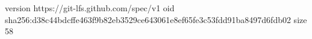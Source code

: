 version https://git-lfs.github.com/spec/v1
oid sha256:d38c44bdcffe463f9b82eb3529ce643061e8ef65fe3c53fdd91ba8497d6fdb02
size 58
